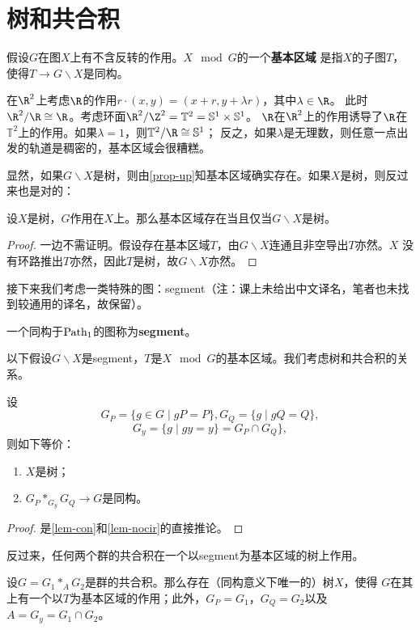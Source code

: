 \section{树和共合积}
\begin{definition}
    假设$G$在图$X$上有不含反转的作用。$X \mod{G}$的一个\textbf{基本区域}
    是指$X$的子图$T$，使得$T \to G\backslash X$是同构。
\end{definition}
\begin{example}
    在$\R^2$上考虑$\R$的作用$r\cdot(x,y) = (x+r,y+\lambda r)$，其中$\lambda \in \R$。
    此时$\R^2/\R \cong \R$。考虑环面$\R^2/\Z^2 = \mathbb{T}^2 = \mathbb{S}^1 \times \mathbb{S}^1$。
    $\R$在$\R^2$上的作用诱导了$\R$在$\mathbb{T}^2$上的作用。如果$\lambda = 1$，则$\mathbb{T}^2/\R \cong \mathbb{S}^1$；
    反之，如果$\lambda$是无理数，则任意一点出发的轨道是稠密的，基本区域会很糟糕。
\end{example}
显然，如果$G\backslash X$是树，则由\ref{prop-up}知基本区域确实存在。如果$X$是树，则反过来也是对的：
\begin{proposition}
    设$X$是树，$G$作用在$X$上。那么基本区域存在当且仅当$G\backslash X$是树。
\end{proposition}
\begin{proof}
    一边不需证明。假设存在基本区域$T$，由$G\backslash X$连通且非空导出$T$亦然。$X$
    没有环路推出$T$亦然，因此$T$是树，故$G \backslash X$亦然。
\end{proof}
接下来我们考虑一类特殊的图：segment（注：课上未给出中文译名，笔者也未找到较通用的译名，故保留）。
\begin{definition}
    一个同构于$\operatorname{Path}_1$的图称为\textbf{segment}。
\end{definition}
以下假设$G\backslash X$是segment，$T$是$X \mod{G}$的基本区域。我们考虑树和共合积的关系。
\begin{theorem}\label{thm-treeiso}
    设\[G_P = \{g \in G \mid gP = P\},G_Q = \{g \mid gQ = Q\}, \]
    \[G_y = \{g \mid gy = y\} = G_P \cap G_Q\},\]
    则如下等价：
    \begin{enumerate}
        \item $X$是树；
        \item $G_P *_{G_y} G_Q \to G$是同构。
    \end{enumerate}
\end{theorem}
\begin{proof}
    是\ref{lem-con}和\ref{lem-nocir}的直接推论。
\end{proof}
反过来，任何两个群的共合积在一个以segment为基本区域的树上作用。
\begin{theorem}\label{thm-existtree}
    设$G = G_1 *_A G_2$是群的共合积。那么存在（同构意义下唯一的）树$X$，使得
    $G$在其上有一个以$T$为基本区域的作用；此外，$G_P = G_1$，$G_Q = G_2$以及
    $A = G_y = G_1 \cap G_2$。
\end{theorem}
